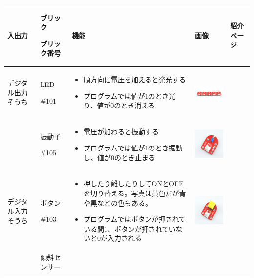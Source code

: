 \documentclass[a4paper,dvipdfmx]{jarticle}
\begin{document}
\bigskip

\begin{flushleft}
\tablefirsthead{}
\tablehead{}
\tabletail{}
\tablelasttail{}
\begin{supertabular}{|m{2.34cm}|m{2.658cm}|m{6.4090004cm}|m{3.672cm}|m{1.211cm}|}
\hline
{\mdseries 入出力} &
{\mdseries ブリック}

{\mdseries ブリック番号} &
{\mdseries 機能} &
{\mdseries 画像} &
{\mdseries 紹介ページ}\\\hline
{\mdseries デジタル出力そうち} &
{\mdseries LED}

{\mdseries \#101} &
\begin{itemize}
\item 順方向に電圧を加えると発光する
\item
プログラムでは値が1のとき光り、値が0のとき消える
\end{itemize}
 &
\centering
\includegraphics[width=3.699cm,height=2.092cm]{text05-img/text05-img015.png}
 &
{\mdseries \pageref{bkm:RefHeadingToc25509508239293}}\\\hline
 &
{\mdseries 振動子}

{\mdseries \#105} &
\begin{itemize}
\item 電圧が加わると振動する
\item
プログラムでは値が1のとき振動し、値が0のとき止まる
\end{itemize}
 &
\centering
\includegraphics[width=2.616cm,height=2.577cm]{text05-img/text05-img016.png}
 &
{\mdseries \pageref{bkm:RefHeadingToc25513508239293}}\\\hline
{\mdseries デジタル入力そうち} &
{\mdseries ボタン}

{\mdseries \#103} &
\begin{itemize}
\item
押したり離したりしてONとOFFを切り替える。写真は黄色だが青や黒などの色もある。
\item
プログラムではボタンが押されている間1、ボタンが押されていないと0が入力される
\end{itemize}
 &
\centering
\includegraphics[width=2.411cm,height=2.378cm]{text05-img/text05-img005.png}
 &
{\mdseries \pageref{bkm:RefHeadingToc25515508239293}}\\\hline
 &
{\mdseries 傾斜センサー}


\end{supertabular}
\end{flushleft}
\end{document}
